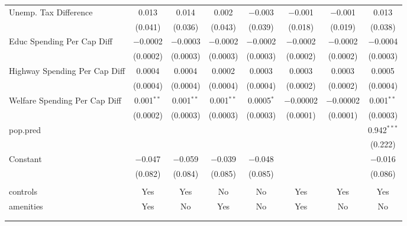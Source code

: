 \begin{table}[!htbp]
\begin{tabular}{@{\extracolsep{5pt}}lccccccc}
  Unemp. Tax Difference & 0.013 & 0.014 & 0.002 & $-$0.003 & $-$0.001 & $-$0.001 & 0.013 \\ 
  & (0.041) & (0.036) & (0.043) & (0.039) & (0.018) & (0.019) & (0.038) \\ 
  Educ Spending Per Cap Diff & $-$0.0002 & $-$0.0003 & $-$0.0002 & $-$0.0002 & $-$0.0002 & $-$0.0002 & $-$0.0004 \\ 
  & (0.0002) & (0.0003) & (0.0003) & (0.0003) & (0.0002) & (0.0002) & (0.0003) \\ 
  Highway Spending Per Cap Diff & 0.0004 & 0.0004 & 0.0002 & 0.0003 & 0.0003 & 0.0003 & 0.0005 \\ 
  & (0.0004) & (0.0004) & (0.0004) & (0.0004) & (0.0002) & (0.0002) & (0.0004) \\ 
  Welfare Spending Per Cap Diff & 0.001$^{**}$ & 0.001$^{**}$ & 0.001$^{**}$ & 0.0005$^{*}$ & $-$0.00002 & $-$0.00002 & 0.001$^{**}$ \\ 
  & (0.0002) & (0.0003) & (0.0003) & (0.0003) & (0.0001) & (0.0001) & (0.0003) \\ 
  pop.pred &  &  &  &  &  &  & 0.942$^{***}$ \\ 
  &  &  &  &  &  &  & (0.222) \\ 
  Constant & $-$0.047 & $-$0.059 & $-$0.039 & $-$0.048 &  &  & $-$0.016 \\ 
  & (0.082) & (0.084) & (0.085) & (0.085) &  &  & (0.086) \\ 
 \hline \\[-1.8ex] 
controls & Yes & Yes & No & No & Yes & Yes & Yes \\ 
amenities & Yes & No & Yes & No & Yes & No & No \\ 
\hline \\[-1.8ex] 
\hline 
\hline \\[-1.8ex] 
\end{tabular} 
\end{table} 
